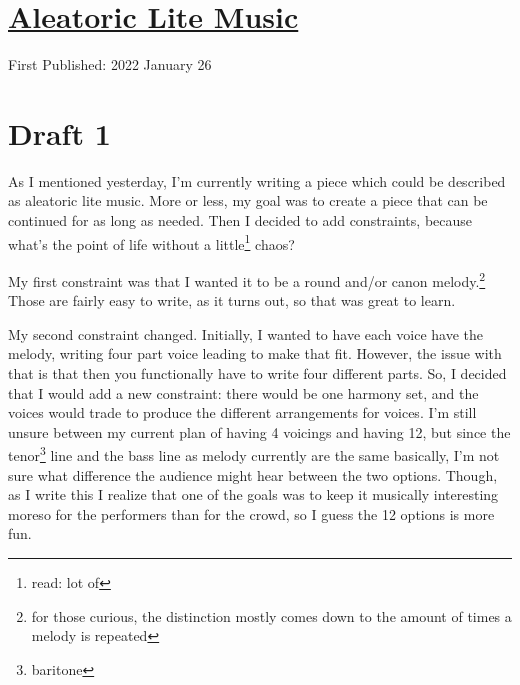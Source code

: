 \documentclass[12pt]{article}[titlepage]
\newcommand{\1}{\={a}}
\newcommand{\2}{\={e}}
\newcommand{\3}{\={\i}}
\newcommand{\4}{\=o}
\newcommand{\5}{\=u}
\newcommand{\6}{\={A}}
\renewcommand{\,}{\textsuperscript{,}}
\begin{document}
\doublespacing
\section{\href{aleatoric-lite.html}{Aleatoric Lite Music}}
First Published: 2022 January 26

\section{Draft 1}
As I mentioned yesterday, I'm currently writing a piece which could be described as aleatoric lite music.
More or less, my goal was to create a piece that can be continued for as long as needed.
Then I decided to add constraints, because what's the point of life without a little\footnote{read: lot of} chaos?

My first constraint was that I wanted it to be a round and/or canon melody.\footnote{for those curious, the distinction mostly comes down to the amount of times a melody is repeated}
Those are fairly easy to write, as it turns out, so that was great to learn.

My second constraint changed.
Initially, I wanted to have each voice have the melody, writing four part voice leading to make that fit.
However, the issue with that is that then you functionally have to write four different parts.
So, I decided that I would add a new constraint: there would be one harmony set, and the voices would trade to produce the different arrangements for voices.
I'm still unsure between my current plan of having 4 voicings and having 12, but since the tenor\footnote{baritone} line and the bass line as melody currently are the same basically, I'm not sure what difference the audience might hear between the two options.
Though, as I write this I realize that one of the goals was to keep it musically interesting moreso for the performers than for the crowd, so I guess the 12 options is more fun.
\end{document}
